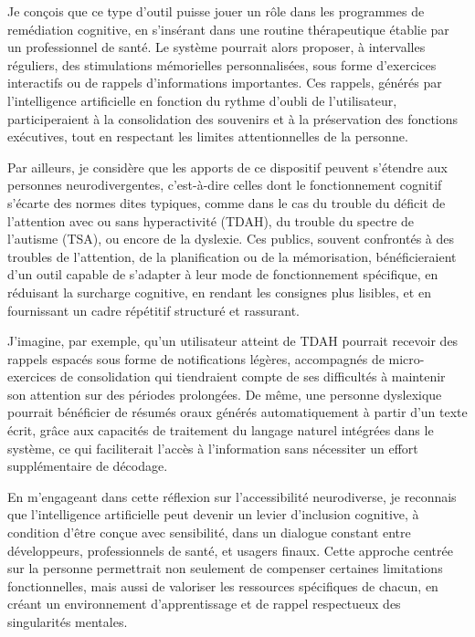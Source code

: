 \documentclass[11pt,a4paper]{report}
\begin{document}
Je conçois que ce type d’outil puisse jouer un rôle dans les programmes de remédiation cognitive, en s’insérant dans une routine thérapeutique établie par un professionnel de santé. Le système pourrait alors proposer, à intervalles réguliers, des stimulations mémorielles personnalisées, sous forme d’exercices interactifs ou de rappels d’informations importantes. Ces rappels, générés par l’intelligence artificielle en fonction du rythme d’oubli de l’utilisateur, participeraient à la consolidation des souvenirs et à la préservation des fonctions exécutives, tout en respectant les limites attentionnelles de la personne.

Par ailleurs, je considère que les apports de ce dispositif peuvent s’étendre aux personnes neurodivergentes, c’est-à-dire celles dont le fonctionnement cognitif s’écarte des normes dites typiques, comme dans le cas du trouble du déficit de l’attention avec ou sans hyperactivité (TDAH), du trouble du spectre de l’autisme (TSA), ou encore de la dyslexie. Ces publics, souvent confrontés à des troubles de l’attention, de la planification ou de la mémorisation, bénéficieraient d’un outil capable de s’adapter à leur mode de fonctionnement spécifique, en réduisant la surcharge cognitive, en rendant les consignes plus lisibles, et en fournissant un cadre répétitif structuré et rassurant.

J’imagine, par exemple, qu’un utilisateur atteint de TDAH pourrait recevoir des rappels espacés sous forme de notifications légères, accompagnés de micro-exercices de consolidation qui tiendraient compte de ses difficultés à maintenir son attention sur des périodes prolongées. De même, une personne dyslexique pourrait bénéficier de résumés oraux générés automatiquement à partir d’un texte écrit, grâce aux capacités de traitement du langage naturel intégrées dans le système, ce qui faciliterait l’accès à l’information sans nécessiter un effort supplémentaire de décodage.

En m’engageant dans cette réflexion sur l’accessibilité neurodiverse, je reconnais que l’intelligence artificielle peut devenir un levier d’inclusion cognitive, à condition d’être conçue avec sensibilité, dans un dialogue constant entre développeurs, professionnels de santé, et usagers finaux. Cette approche centrée sur la personne permettrait non seulement de compenser certaines limitations fonctionnelles, mais aussi de valoriser les ressources spécifiques de chacun, en créant un environnement d’apprentissage et de rappel respectueux des singularités mentales.
\end{document}
